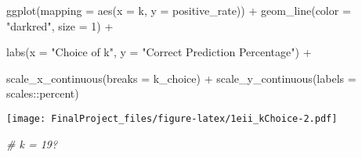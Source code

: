 \documentclass[
]{article}
\newenvironment{Shaded}{\begin{snugshade}}{\end{snugshade}}
\newcommand{\AttributeTok}[1]{\textcolor[rgb]{0.77,0.63,0.00}{#1}}
\newcommand{\CommentTok}[1]{\textcolor[rgb]{0.56,0.35,0.01}{\textit{#1}}}
\newcommand{\DecValTok}[1]{\textcolor[rgb]{0.00,0.00,0.81}{#1}}
\newcommand{\FunctionTok}[1]{\textcolor[rgb]{0.00,0.00,0.00}{#1}}
\newcommand{\NormalTok}[1]{#1}
\newcommand{\OtherTok}[1]{\textcolor[rgb]{0.56,0.35,0.01}{#1}}
\newcommand{\SpecialCharTok}[1]{\textcolor[rgb]{0.00,0.00,0.00}{#1}}
\newcommand{\StringTok}[1]{\textcolor[rgb]{0.31,0.60,0.02}{#1}}
\begin{document}
\begin{Shaded}
\begin{Highlighting}[]
  \FunctionTok{ggplot}\NormalTok{(}\AttributeTok{mapping =} \FunctionTok{aes}\NormalTok{(}\AttributeTok{x =}\NormalTok{ k,}
                       \AttributeTok{y =}\NormalTok{ positive\_rate)) }\SpecialCharTok{+}
  \FunctionTok{geom\_line}\NormalTok{(}\AttributeTok{color =} \StringTok{"darkred"}\NormalTok{,}
            \AttributeTok{size =} \DecValTok{1}\NormalTok{) }\SpecialCharTok{+} 
  
  \FunctionTok{labs}\NormalTok{(}\AttributeTok{x =} \StringTok{"Choice of k"}\NormalTok{,}
       \AttributeTok{y =} \StringTok{"Correct Prediction Percentage"}\NormalTok{) }\SpecialCharTok{+}
  
  \FunctionTok{scale\_x\_continuous}\NormalTok{(}\AttributeTok{breaks =}\NormalTok{ k\_choice) }\SpecialCharTok{+}
  \FunctionTok{scale\_y\_continuous}\NormalTok{(}\AttributeTok{labels =}\NormalTok{ scales}\SpecialCharTok{::}\NormalTok{percent)}
\end{Highlighting}
\end{Shaded}

\texttt{[image: FinalProject\_files/figure-latex/1eii\_kChoice-2.pdf]}

\begin{Shaded}
\begin{Highlighting}[]
\CommentTok{\# k = 19?}
\end{Highlighting}
\end{Shaded}

\begin{Shaded}
\end{Shaded}
\end{document}
